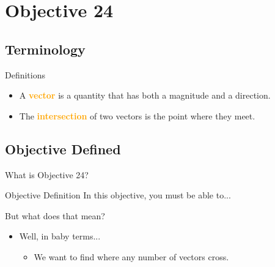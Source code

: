 \section{Objective 24}
\subsection{Terminology}
\frame{\subsectionpage}
\begin{frame}{Definitions}
    \begin{itemize}
        \item<1-2>{A \textcolor{orange}{\textbf{vector}} is a quantity that has both a magnitude and a direction.}
        \item<2>{The \textcolor{orange}{\textbf{intersection}} of two vectors is the point where they meet.}
    \end{itemize}
\end{frame}
\subsection{Objective Defined}
\frame{\subsectionpage}
\begin{frame}{What is Objective 24?}
    \begin{block}{Objective Definition}
        In this objective, you must be able to... \\
        \color{orange}{``Find points of intersection of intersecting vectors.``}
    \end{block}
\end{frame}
\begin{frame}{But what does that mean?}
    \begin{itemize}
        \item<1-2>{Well, in baby terms...}
        \begin{itemize}
            \item<2>{We want to find where any number of vectors cross.}
        \end{itemize}
    \end{itemize}
\end{frame}
